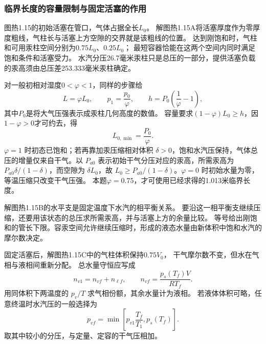 \documentclass[UTF8,fontset=fandol,a4paper,11pt]{ctexart}
\begin{document}
\subsubsection*{临界长度的容量限制与固定活塞的作用}
图热1.15的初始活塞在管口，气体占据全长$L_0$。
解图热1.15A将活塞厚度作为零厚度粗线，气柱长与活塞上方空隙的交界就是该粗线的位置。
达到刚饱和时，气柱和可用汞柱空间分别为$0.75L_0$、$0.25L_0$；
最短容器恰能在这两个空间内同时满足饱和条件和活塞受力。
水汽分压26.7毫米汞柱只是总压的一部分，提供活塞负载的汞高须由总压差253.333毫米汞柱确定。

对一般初相对湿度$0<\varphi<1$，同样的步骤给
\[
L=\varphi L_0,\qquad
p_1=\frac{p_0}{\varphi},\qquad
h=P_0\left(\frac1\varphi-1\right),
\]
其中$P_0$是将大气压强表示成汞柱几何高度的数值。
容量要求$(1-\varphi)L_0\ge h$，因$1-\varphi>0$才可约去，得
\[
L_{0,\min}=\frac{P_0}{\varphi}.
\]
$\varphi=1$ 时初态已饱和；若再靠加汞压缩相对体积 $\delta>0$，饱和水汽压保持，气体总压的增量仅来自干气。以 $P_{a0}$ 表示初始干气分压对应的汞高，所需汞高为 $P_{a0}\delta/(1-\delta)$，而空隙为 $\delta L_0$，故 $L_0\ge P_{a0}/(1-\delta)$。$\varphi=0$ 时初始水量为零，等温压缩只改变干气压强。
本题$\varphi=0.75$，才可使用已经求得的1.013米临界长度。

解图热1.15B的水平支是固定温度下水汽的相平衡关系。
要沿这一相平衡支继续压缩，还要用该状态的总压求所需汞高，并与活塞上方的余量比较。
等号给出刚饱和的管长下限。容汞空间允许继续压缩时，形成的液态水量由新体积中饱和水汽的摩尔数决定。

固定活塞后，解图热1.15C中的气柱体积保持$0.75V_0$，
干气摩尔数不变，但水在气相与液相间重新分配。
总水量守恒应写成
\[
n_{v1}=n_{vf}+n_{\ell f},\qquad
n_{vf}=\frac{p_s(T_f)V}{RT_f}.
\]
用同体积下两温度的 $p_v/T$ 求气相份额，其余水量计为液相。
若液体体积可略，任意终温时水汽压的一般选择为
\[
p_{vf}=\min\left[p_{v1}\frac{T_f}{T_1},p_s(T_f)\right].
\]
取其中较小的分压，与定量、定容的干气压相加。
\end{document}
